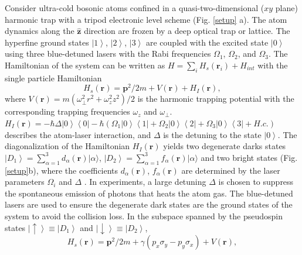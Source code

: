 \documentclass[prl,twocolumn,showpacs,floatfix]{revtex4}
\begin{document}
Consider ultra-cold bosonic atoms confined in a quasi-two-dimensional ($xy$
plane) harmonic trap with a tripod electronic level scheme (Fig. \ref{setup}%
a). The atom dynamics along the $\mathbf{\hat{z}}$ direction are frozen by a
deep optical trap or lattice. The hyperfine ground states $\left\vert
1\right\rangle $, $\left\vert 2\right\rangle $, $\left\vert 3\right\rangle $
are coupled with the excited state $\left\vert 0\right\rangle $ using three
blue-detuned lasers with the Rabi frequencies $\Omega _{1}$, $\Omega _{2}$,
and $\Omega _{3}$. The Hamiltonian of the system can be written as $%
H=\sum_{i}H_{s}(\mathbf{r}_{i})+H_{int}$ with the single particle
Hamiltonian
\begin{equation}
H_{s}(\mathbf{r})=\mathbf{p}^{2}/2m+V(\mathbf{r})+H_{I}(\mathbf{r}),
\label{many}
\end{equation}%
where $V(\mathbf{r})=m\left( \omega _{\perp }^{2}r^{2}+\omega
_{z}^{2}z^{2}\right) /2$ is the harmonic trapping potential with the
corresponding trapping frequencies $\omega _{z}$ and $\omega _{\perp }$. $%
H_{I}(\mathbf{r})=-\hbar \Delta \left\vert 0\right\rangle \left\langle
0\right\vert -\hbar \left( \Omega _{1}\left\vert 0\right\rangle \left\langle
1\right\vert +\Omega _{2}\left\vert 0\right\rangle \left\langle 2\right\vert
+\Omega _{3}\left\vert 0\right\rangle \left\langle 3\right\vert +H.c.\right)
$ describes the atom-laser interaction, and $\Delta $ is the detuning to the
state $\left\vert 0\right\rangle $. The diagonalization of the Hamiltonian $%
H_{I}(\mathbf{r})$ yields two degenerate darks states $\left\vert
D_{1}\right\rangle =\sum_{\alpha =1}^{3}d_{\alpha }(\mathbf{r})|\alpha
\rangle $, $\left\vert D_{2}\right\rangle =\sum_{\alpha =1}^{3}f_{\alpha }(%
\mathbf{r})|\alpha \rangle $ and two bright states (Fig. \ref{setup}b),
where the coefficients $d_{\alpha }(\mathbf{r})$, $f_{\alpha }(\mathbf{r})$
are determined by the laser parameters $\Omega _{i}$ and $\Delta $ \cite%
{note1}. In experiments, a large detuning $\Delta $ is chosen to suppress
the spontaneous emission of photons that heats the atom gas. The
blue-detuned lasers are used to ensure the degenerate dark states are the
ground states of the system to avoid the collision loss. In the subspace
spanned by the pseudospin states $\left\vert \uparrow \right\rangle \equiv
\left\vert D_{1}\right\rangle $ and $\left\vert \downarrow \right\rangle
\equiv \left\vert D_{2}\right\rangle $,
\begin{equation}
H_{s}(\mathbf{r})=\mathbf{p}^{2}/2m+\gamma \left( p_{x}\sigma
_{y}-p_{y}\sigma _{x}\right) +V(\mathbf{r}),  \label{single}
\end{equation}%
\end{document}
